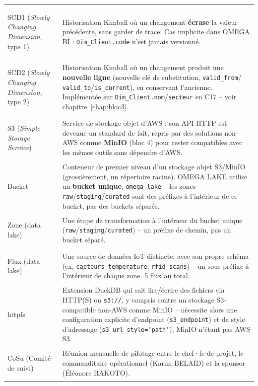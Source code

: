 \begin{longtable}{@{}>{\bfseries\raggedright}p{3.4cm} p{12.2cm}@{}}
\label{gloss:scd1}SCD1 (\textit{Slowly Changing Dimension}, type 1) &
Historisation Kimball où un changement \textbf{écrase} la valeur
précédente, sans garder de trace. Cas implicite dans OMEGA BI :
\texttt{Dim\_Client.code} n'est jamais versionné. \\

\label{gloss:scd2}SCD2 (\textit{Slowly Changing Dimension}, type 2) &
Historisation Kimball où un changement produit une \textbf{nouvelle
ligne} (nouvelle clé de substitution, \texttt{valid\_from}/
\texttt{valid\_to}/\texttt{is\_current}), en conservant l'ancienne.
Implémentée sur \texttt{Dim\_Client.nom}/\texttt{secteur} en C17 --
voir chapitre~\ref{chap:bloc3}. \\

\label{gloss:s3}S3 (\textit{Simple Storage Service}) &
Service de stockage objet d'AWS ; son API HTTP est devenue un standard
de fait, repris par des solutions non-AWS comme \textbf{MinIO}
(bloc 4) pour rester compatibles avec les mêmes outils sans dépendre
d'AWS. \\

\label{gloss:bucket}Bucket &
Conteneur de premier niveau d'un stockage objet S3/MinIO
(grossièrement, un répertoire racine). OMEGA LAKE utilise un
\textbf{bucket unique}, \texttt{omega-lake} -- les zones
\texttt{raw}/\texttt{staging}/\texttt{curated} sont des préfixes à
l'intérieur de ce bucket, pas des buckets séparés. \\

\label{gloss:zone-lake}Zone (data lake) &
Une étape de transformation à l'intérieur du bucket unique
(\texttt{raw}/\texttt{staging}/\texttt{curated}) -- un préfixe de
chemin, pas un bucket séparé. \\

\label{gloss:flux-lake}Flux (data lake) &
Une source de données IoT distincte, avec son propre schéma (ex.
\texttt{capteurs\_temperature}, \texttt{rfid\_scans}) -- un
sous-préfixe à l'intérieur de chaque zone. 5 flux au total. \\

\label{gloss:httpfs}httpfs &
Extension DuckDB qui sait lire/écrire des fichiers via HTTP(S) ou
\texttt{s3://}, y compris contre un stockage S3-compatible non-AWS
comme MinIO -- nécessite alors une configuration explicite d'endpoint
(\texttt{s3\_endpoint}) et de style d'adressage
(\texttt{s3\_url\_style='path'}), MinIO n'étant pas AWS S3. \\

\label{gloss:cosu}CoSu (Comité de suivi) &
Réunion mensuelle de pilotage entre le chef·fe de projet, le
commanditaire opérationnel (Karim BELAÏD) et la sponsor (Éléonore
RAKOTO). \\


\end{longtable}
